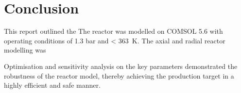 \section{Conclusion} \label{sec:conclusion}
This report outlined the
The reactor was modelled on COMSOL 5.6 with operating conditions of 1.3 bar and \SI{< 363}{\K}.
The axial and radial reactor modelling was 

Optimisation and sensitivity analysis on the key parameters demonstrated the robustness of the reactor model, thereby achieving the production target in a highly efficient and safe manner. 